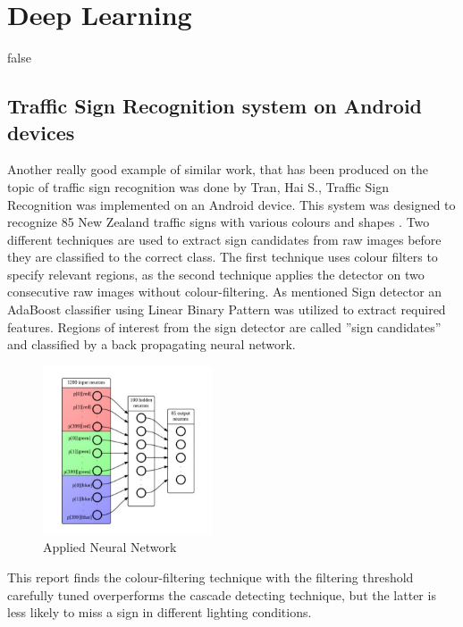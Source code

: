 \section{Deep Learning}
\if false

\subsection{Traffic Sign Recognition system on Android devices}
Another really good example of similar work, that has been produced on the topic of traffic sign recognition was done by Tran, Hai S., Traffic Sign Recognition was implemented on an Android device. This system was designed to recognize 85 New Zealand traffic signs with various colours and shapes \cite{androidnn}. \newline
Two different techniques are used to extract sign candidates from raw images before they are classified to the correct class. The first technique uses colour filters to specify relevant regions, as the
second technique applies the detector on two consecutive raw images without colour-filtering. As mentioned Sign detector an AdaBoost classifier using Linear Binary Pattern was utilized to extract required features. Regions of interest from the sign detector are called ”sign candidates” and classified by a back propagating neural network. 

\begin{figure}[H]
	\centering
	\includegraphics[height=5cm]{images/tranNN.jpg}
	\caption{Applied Neural Network}
	\label{fig:tranNN}
\end{figure}




This report
finds the colour-filtering technique with the filtering threshold carefully tuned
overperforms the cascade detecting technique, but the latter is less likely to
miss a sign in different lighting conditions.

\fi

